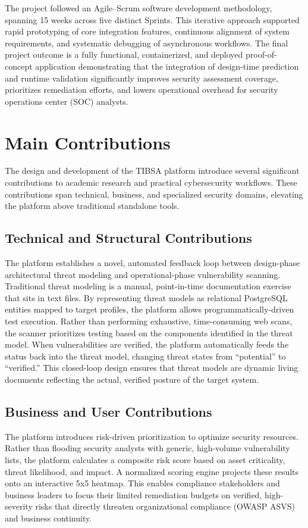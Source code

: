 The project followed an Agile--Scrum software development methodology, spanning 15 weeks across five distinct Sprints. This iterative approach supported rapid prototyping of core integration features, continuous alignment of system requirements, and systematic debugging of asynchronous workflows. The final project outcome is a fully functional, containerized, and deployed proof-of-concept application demonstrating that the integration of design-time prediction and runtime validation significantly improves security assessment coverage, prioritizes remediation efforts, and lowers operational overhead for security operations center (SOC) analysts.

\section{Main Contributions}
\label{sec:ch7_main_contributions}

The design and development of the TIBSA platform introduce several significant contributions to academic research and practical cybersecurity workflows. These contributions span technical, business, and specialized security domains, elevating the platform above traditional standalone tools.

\subsection{Technical and Structural Contributions}
The platform establishes a novel, automated feedback loop between design-phase architectural threat modeling and operational-phase vulnerability scanning. Traditional threat modeling is a manual, point-in-time documentation exercise that sits in text files. By representing threat models as relational PostgreSQL entities mapped to target profiles, the platform allows programmatically-driven test execution. Rather than performing exhaustive, time-consuming web scans, the scanner prioritizes testing based on the components identified in the threat model. When vulnerabilities are verified, the platform automatically feeds the status back into the threat model, changing threat states from ``potential'' to ``verified.'' This closed-loop design ensures that threat models are dynamic living documents reflecting the actual, verified posture of the target system.

\subsection{Business and User Contributions}
The platform introduces risk-driven prioritization to optimize security resources. Rather than flooding security analysts with generic, high-volume vulnerability lists, the platform calculates a composite risk score based on asset criticality, threat likelihood, and impact. A normalized scoring engine projects these results onto an interactive 5x5 heatmap. This enables compliance stakeholders and business leaders to focus their limited remediation budgets on verified, high-severity risks that directly threaten organizational compliance (OWASP ASVS) and business continuity. 

